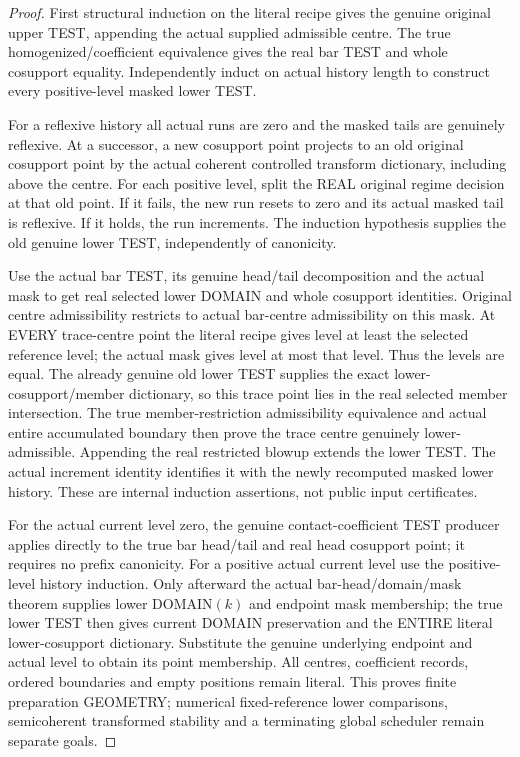 \begin{proof}
First structural induction on the literal recipe gives the genuine
original upper TEST, appending the actual supplied admissible centre.
The true homogenized/coefficient equivalence gives the real bar TEST and
whole cosupport equality. Independently induct on actual history length
to construct every positive-level masked lower TEST.

For a reflexive history all actual runs are zero and the masked tails
are genuinely reflexive. At a successor, a new cosupport point projects
to an old original cosupport point by the actual coherent controlled
transform dictionary, including above the centre. For each positive
level, split the REAL original regime decision at that old point. If it
fails, the new run resets to zero and its actual masked tail is reflexive.
If it holds, the run increments. The induction hypothesis supplies the
old genuine lower TEST, independently of canonicity.

Use the actual bar TEST, its genuine head/tail decomposition and the
actual mask to get real selected lower DOMAIN and whole cosupport
identities. Original centre admissibility restricts to actual bar-centre
admissibility on this mask. At EVERY trace-centre point the literal recipe
gives level at least the selected reference level; the actual mask gives
level at most that level. Thus the levels are equal. The already genuine
old lower TEST supplies the exact lower-cosupport/member dictionary, so
this trace point lies in the real selected member intersection. The true
member-restriction admissibility equivalence and actual entire accumulated
boundary then prove the trace centre genuinely lower-admissible. Appending
the real restricted blowup extends the lower TEST. The actual increment
identity identifies it with the newly recomputed masked lower history.
These are internal induction assertions, not public input certificates.

For the actual current level zero, the genuine contact-coefficient TEST
producer applies directly to the true bar head/tail and real head cosupport
point; it requires no prefix canonicity. For a positive actual current
level use the positive-level history induction. Only afterward the actual
bar-head/domain/mask theorem supplies lower DOMAIN$(k)$ and endpoint mask
membership; the true lower TEST then gives current DOMAIN preservation
and the ENTIRE literal lower-cosupport dictionary. Substitute the genuine
underlying endpoint and actual level to obtain its point membership.
All centres, coefficient records, ordered boundaries and empty positions
remain literal. This proves finite preparation GEOMETRY; numerical
fixed-reference lower comparisons, semicoherent transformed stability and
a terminating global scheduler remain separate goals.
\end{proof}
